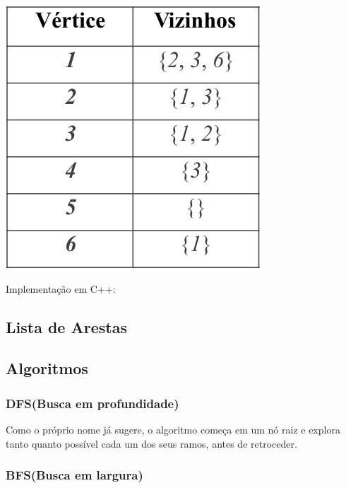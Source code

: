 \documentclass[a4paper,12pt]{article}
\begin{document}
\begin{center}
  \includegraphics[width=\linewidth/2]{figures/grafos/representacao_lista_adj.png}
\end{center}

\noindent Implementação em C++:


\subsection{Lista de Arestas}


\subsection{Algoritmos}
\subsubsection{DFS(Busca em profundidade)}

Como o próprio nome já sugere, o algoritmo começa em um nó raiz e explora tanto quanto possível cada um dos seus ramos, antes de retroceder.


\subsubsection{BFS(Busca em largura)}
\end{document}
